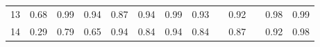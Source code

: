 \documentclass[twoside,11pt]{article}
\begin{document}
\begin{table}[H]
{\begin{tabular}{cccccccclclcc}
\multicolumn{1}{|c|}{13}                                                                          & \multicolumn{1}{c|}{0.68}                                                           & \multicolumn{1}{c|}{\cellcolor[HTML]{FFCCC9}0.99}                                              & \multicolumn{1}{c|}{\cellcolor[HTML]{ECF4FF}0.94}                                        & \multicolumn{1}{c|}{0.87}                                                                & \multicolumn{1}{c|}{\cellcolor[HTML]{ECF4FF}0.94}                                        & \multicolumn{1}{c|}{\cellcolor[HTML]{FFCCC9}0.99}                                           & \multicolumn{1}{c|}{0.93}                                                                   & \multicolumn{1}{l|}{}                                                                          & \multicolumn{1}{c|}{0.92}                                                                   & \multicolumn{1}{l|}{}                    & \multicolumn{1}{c|}{0.98}                                                                      & \multicolumn{1}{c|}{0.99}                                                                      \\ \cline{1-1}
\multicolumn{1}{|c|}{14}                                                                          & \multicolumn{1}{c|}{0.29}                                                           & \multicolumn{1}{c|}{0.79}                                                                      & \multicolumn{1}{c|}{0.65}                                                                & \multicolumn{1}{c|}{\cellcolor[HTML]{FFCCC9}0.94}                                        & \multicolumn{1}{c|}{0.84}                                                                & \multicolumn{1}{c|}{\cellcolor[HTML]{FFCCC9}0.94}                                           & \multicolumn{1}{c|}{0.84}                                                                   & \multicolumn{1}{l|}{}                                                                          & \multicolumn{1}{c|}{\cellcolor[HTML]{ECF4FF}0.87}                                           & \multicolumn{1}{l|}{}                    & \multicolumn{1}{c|}{0.92}                                                                      & \multicolumn{1}{c|}{0.98}                                                                      \\ \cline{1-1}

\end{tabular}}
\end{table}
\end{document}
